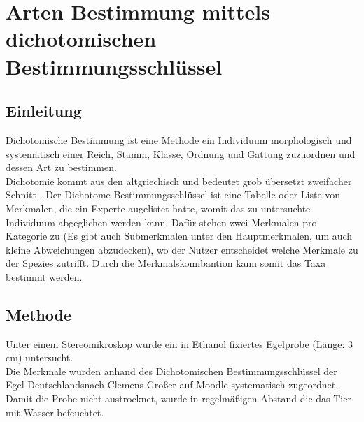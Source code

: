 \documentclass[oneside,10pt,a4paper]{report}
\begin{document}
	
	
		\section{Arten Bestimmung mittels dichotomischen Bestimmungsschlüssel}\label{Abschnitt: DichoBestim}
			\subsection{Einleitung}
				Dichotomische Bestimmung ist eine Methode ein Individuum morphologisch und systematisch einer Reich, Stamm, Klasse, Ordnung und Gattung zuzuordnen und dessen Art zu bestimmen.\\
				Dichotomie kommt aus den altgriechisch und bedeutet grob übersetzt zweifacher Schnitt \cite{wiki_dichotom}.
				Der Dichotome Bestimmungsschlüssel ist eine Tabelle oder Liste von Merkmalen, die ein Experte augelistet hatte, womit das zu untersuchte Individuum abgeglichen werden kann. Dafür stehen zwei Merkmalen pro Kategorie zu (Es gibt auch Submerkmalen unter den Hauptmerkmalen, um auch kleine Abweichungen abzudecken), wo der Nutzer entscheidet welche Merkmale zu der Spezies zutrifft\cite{dichotomer_schlüssel}. Durch die Merkmalskomibantion kann somit das Taxa bestimmt werden.
			
			\subsection{Methode}
				Unter einem Stereomikroskop wurde ein in Ethanol fixiertes Egelprobe (Länge: 3 cm) untersucht.\\
				Die Merkmale wurden anhand des Dichotomischen Bestimmungsschlüssel der Egel Deutschlandsnach Clemens Großer auf Moodle systematisch zugeordnet.\\
				Damit die Probe nicht austrocknet, wurde in regelmäßigen Abstand die das Tier mit Wasser befeuchtet.
			
\end{document}
